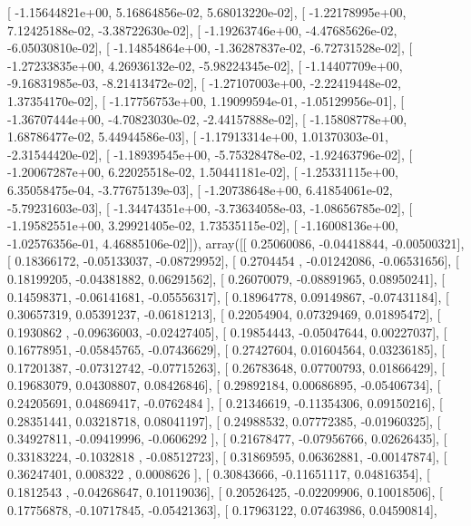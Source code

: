 \documentclass{article}
\begin{document}
       [ -1.15644821e+00,   5.16864856e-02,   5.68013220e-02],
       [ -1.22178995e+00,   7.12425188e-02,  -3.38722630e-02],
       [ -1.19263746e+00,  -4.47685626e-02,  -6.05030810e-02],
       [ -1.14854864e+00,  -1.36287837e-02,  -6.72731528e-02],
       [ -1.27233835e+00,   4.26936132e-02,  -5.98224345e-02],
       [ -1.14407709e+00,  -9.16831985e-03,  -8.21413472e-02],
       [ -1.27107003e+00,  -2.22419448e-02,   1.37354170e-02],
       [ -1.17756753e+00,   1.19099594e-01,  -1.05129956e-01],
       [ -1.36707444e+00,  -4.70823030e-02,  -2.44157888e-02],
       [ -1.15808778e+00,   1.68786477e-02,   5.44944586e-03],
       [ -1.17913314e+00,   1.01370303e-01,  -2.31544420e-02],
       [ -1.18939545e+00,  -5.75328478e-02,  -1.92463796e-02],
       [ -1.20067287e+00,   6.22025518e-02,   1.50441181e-02],
       [ -1.25331115e+00,   6.35058475e-04,  -3.77675139e-03],
       [ -1.20738648e+00,   6.41854061e-02,  -5.79231603e-03],
       [ -1.34474351e+00,  -3.73634058e-03,  -1.08656785e-02],
       [ -1.19582551e+00,   3.29921405e-02,   1.73535115e-02],
       [ -1.16008136e+00,  -1.02576356e-01,   4.46885106e-02]]), array([[ 0.25060086, -0.04418844, -0.00500321],
       [ 0.18366172, -0.05133037, -0.08729952],
       [ 0.2704454 , -0.01242086, -0.06531656],
       [ 0.18199205, -0.04381882,  0.06291562],
       [ 0.26070079, -0.08891965,  0.08950241],
       [ 0.14598371, -0.06141681, -0.05556317],
       [ 0.18964778,  0.09149867, -0.07431184],
       [ 0.30657319,  0.05391237, -0.06181213],
       [ 0.22054904,  0.07329469,  0.01895472],
       [ 0.1930862 , -0.09636003, -0.02427405],
       [ 0.19854443, -0.05047644,  0.00227037],
       [ 0.16778951, -0.05845765, -0.07436629],
       [ 0.27427604,  0.01604564,  0.03236185],
       [ 0.17201387, -0.07312742, -0.07715263],
       [ 0.26783648,  0.07700793,  0.01866429],
       [ 0.19683079,  0.04308807,  0.08426846],
       [ 0.29892184,  0.00686895, -0.05406734],
       [ 0.24205691,  0.04869417, -0.0762484 ],
       [ 0.21346619, -0.11354306,  0.09150216],
       [ 0.28351441,  0.03218718,  0.08041197],
       [ 0.24988532,  0.07772385, -0.01960325],
       [ 0.34927811, -0.09419996, -0.0606292 ],
       [ 0.21678477, -0.07956766,  0.02626435],
       [ 0.33183224, -0.1032818 , -0.08512723],
       [ 0.31869595,  0.06362881, -0.00147874],
       [ 0.36247401,  0.008322  ,  0.0008626 ],
       [ 0.30843666, -0.11651117,  0.04816354],
       [ 0.1812543 , -0.04268647,  0.10119036],
       [ 0.20526425, -0.02209906,  0.10018506],
       [ 0.17756878, -0.10717845, -0.05421363],
       [ 0.17963122,  0.07463986,  0.04590814],
\end{document}
